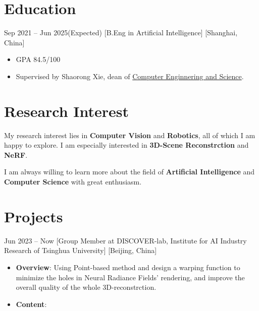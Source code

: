 \documentclass{chicv}
\begin{document}
\begin{basicinfo}
\end{basicinfo}


\section{Education}
  {Sep 2021 -- Jun 2025(Expected)}
  [B.Eng in Artificial Intelligence]
  [Shanghai, China]
  \begin{itemize}
    \item GPA 84.5/100
    \item Supervised by Shaorong Xie, dean of \href{https://cs.shu.edu.cn/}{Computer Enginnering and Science}.
  \end{itemize}

\section{Research Interest}
My research interest lies in \textbf{Computer Vision} and \textbf{Robotics}, all of which I am happy to explore. I am especially interested in \textbf{3D-Scene Reconstrction} and \textbf{NeRF}.

I am always willing to learn more about the field of \textbf{Artificial Intelligence} and \textbf{Computer Science} with great enthusiasm.

\section{Projects}

  {Jun 2023 -- Now}
  [Group Member at DISCOVER-lab, Institute for AI Industry Research of Tsinghua University]
  [Beijing, China]
  \begin{itemize}
    \item \textbf{Overview}: Using Point-based method and design a warping function to minimize the holes in Neural Radiance Fields' rendering, and improve the overall quality of the whole 3D-reconstrction.
    \item \textbf{Content}: 
  \end{itemize}
\end{document}
